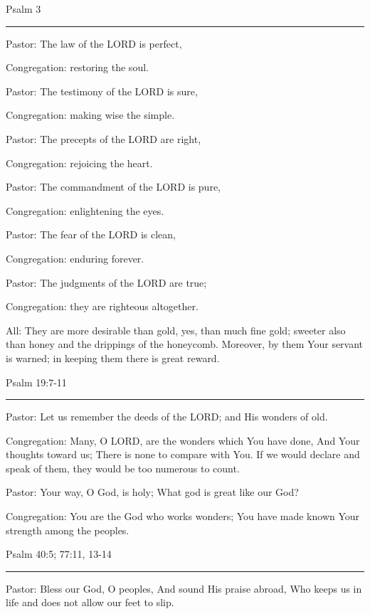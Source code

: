 \documentclass[]{book}
\begin{document}
\textbar{} Psalm 3 \textbar{}

\begin{center}\rule{0.5\linewidth}{\linethickness}\end{center}

Pastor: The law of the LORD is perfect,

Congregation: restoring the soul.

Pastor: The testimony of the LORD is sure,

Congregation: making wise the simple.

Pastor: The precepts of the LORD are right,

Congregation: rejoicing the heart.

Pastor: The commandment of the LORD is pure,

Congregation: enlightening the eyes.

Pastor: The fear of the LORD is clean,

Congregation: enduring forever.

Pastor: The judgments of the LORD are true;

Congregation: they are righteous altogether.

All: They are more desirable than gold, yes, than much fine gold;
sweeter also than honey and the drippings of the honeycomb. Moreover, by
them Your servant is warned; in keeping them there is great reward.

Psalm 19:7-11 \textbar{}

\begin{center}\rule{0.5\linewidth}{\linethickness}\end{center}

Pastor: Let us remember the deeds of the LORD; and His wonders of old.

Congregation: Many, O LORD, are the wonders which You have done, And
Your thoughts toward us; There is none to compare with You. If we would
declare and speak of them, they would be too numerous to count.

Pastor: Your way, O God, is holy; What god is great like our God?

Congregation: You are the God who works wonders; You have made known
Your strength among the peoples.

Psalm 40:5; 77:11, 13-14 \textbar{}

\begin{center}\rule{0.5\linewidth}{\linethickness}\end{center}

Pastor: Bless our God, O peoples, And sound His praise abroad, Who keeps
us in life and does not allow our feet to slip.
\end{document}
